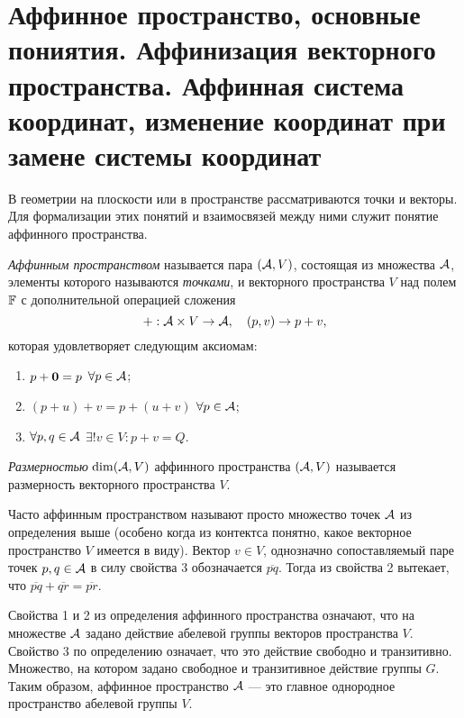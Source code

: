 \section{Аффинное пространство, основные пониятия. Аффинизация векторного пространства. Аффинная система координат, изменение координат при замене системы координат}

В геометрии на плоскости или в пространстве рассматриваются точки и векторы. Для формализации этих понятий и взаимосвязей между ними служит понятие аффинного пространства.

\begin{definition}
    \textit{Аффинным пространством} называется пара $(\mathcal{A}, V)$, состоящая из множества $\mathcal{A}$, элементы которого называются \textit{точками}, и векторного пространства $V$ над полем $\mathbb{F}$ с дополнительной операцией сложения
    \[
        +: \mathcal{A} \times V \to \mathcal{A},\quad (p, v) \to p + v,
    \]
    которая удовлетворяет следующим аксиомам:
    \begin{enumerate}[nolistsep]
        \item $p + \boldsymbol{0} = p$ $\forall p \in \mathcal{A}$;
        \item $(p + u) + v = p + (u + v)$ $\forall p \in \mathcal{A}$;
        \item $\forall p, q \in \mathcal{A}$ $\exists!v \in V : p + v = Q$.
    \end{enumerate}

    \textit{Размерностью} $\dim(\mathcal{A}, V)$ аффинного пространства $(\mathcal{A}, V)$ называется размерность векторного пространства $V$.
\end{definition}

Часто аффинным пространством называют просто множество точек $\mathcal{A}$ из определения выше (особено когда из контектса понятно, какое векторное пространство $V$ имеется в виду). Вектор $v \in V$, однозначно сопоставляемый паре точек $p, q \in \mathcal{A}$ в силу свойства 3 обозначается $\overline{pq}$. Тогда из свойства 2 вытекает, что $\overline{pq} + \overline{qr} = \overline{pr}$.

\begin{remark}
    Свойства 1 и 2 из определения аффинного пространства означают, что на множестве $\mathcal{A}$ задано действие абелевой группы векторов пространства $V$. Свойство 3 по определению означает, что это действие свободно и транзитивно. Множество, на котором задано свободное и транзитивное действие группы $G$. Таким образом, аффинное пространство $\mathcal{A}$ --- это главное однородное пространство абелевой группы $V$.
\end{remark}

